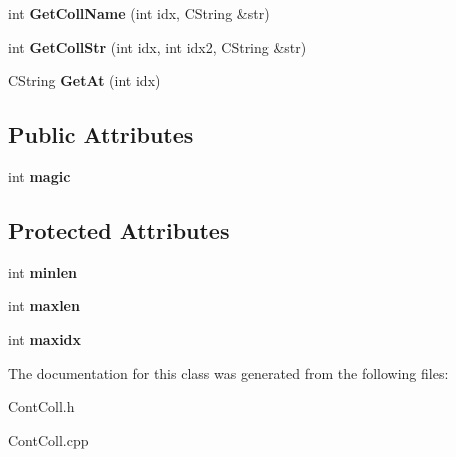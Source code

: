 \begin{DoxyCompactItemize}
\item 
\hypertarget{class_c_str_coll_a4cf9da46caa5530589f1a632aa1e9286}{int {\bfseries Get\-Coll\-Name} (int idx, C\-String \&str)}\label{class_c_str_coll_a4cf9da46caa5530589f1a632aa1e9286}

\item 
\hypertarget{class_c_str_coll_a300bcb007d1d829dbfac78982b8f38cc}{int {\bfseries Get\-Coll\-Str} (int idx, int idx2, C\-String \&str)}\label{class_c_str_coll_a300bcb007d1d829dbfac78982b8f38cc}

\item 
\hypertarget{class_c_str_coll_acd7a12133c3032524420d5e13d5efe48}{C\-String {\bfseries Get\-At} (int idx)}\label{class_c_str_coll_acd7a12133c3032524420d5e13d5efe48}

\end{DoxyCompactItemize}
\subsection*{Public Attributes}
\begin{DoxyCompactItemize}
\item 
\hypertarget{class_c_str_coll_abd29d1159988821e0e09d67d09c0e8fa}{int {\bfseries magic}}\label{class_c_str_coll_abd29d1159988821e0e09d67d09c0e8fa}

\end{DoxyCompactItemize}
\subsection*{Protected Attributes}
\begin{DoxyCompactItemize}
\item 
\hypertarget{class_c_str_coll_a415a237ab5fd74340b0f56a9578938ea}{int {\bfseries minlen}}\label{class_c_str_coll_a415a237ab5fd74340b0f56a9578938ea}

\item 
\hypertarget{class_c_str_coll_a5fa2ecfa02f448715bdbac9d4cf26163}{int {\bfseries maxlen}}\label{class_c_str_coll_a5fa2ecfa02f448715bdbac9d4cf26163}

\item 
\hypertarget{class_c_str_coll_ac15fa77a14c8535ec5b0d2722a93aef8}{int {\bfseries maxidx}}\label{class_c_str_coll_ac15fa77a14c8535ec5b0d2722a93aef8}

\end{DoxyCompactItemize}


The documentation for this class was generated from the following files\-:\begin{DoxyCompactItemize}
\item 
Cont\-Coll.\-h\item 
Cont\-Coll.\-cpp\end{DoxyCompactItemize}
